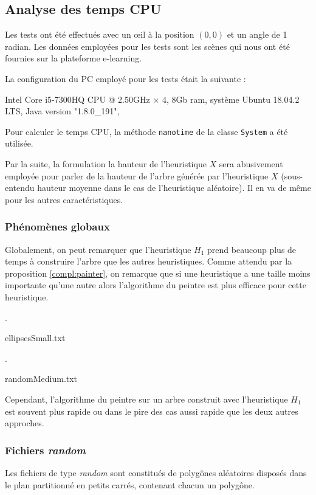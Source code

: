 \subsection{Analyse des temps CPU}
Les tests ont été effectués avec un \oe{}il à la position $(0,0)$ et un
angle de 1 radian. Les données employées pour les tests sont les scènes
qui nous ont été fournies sur la plateforme e-learning.

La configuration du PC employé pour les tests était la suivante :

\begin{center}
  Intel Core i5-7300HQ CPU @ 2.50GHz $\times$ 4,  8Gb ram, système Ubuntu 18.04.2 LTS,
  Java version "1.8.0\_191",
\end{center}
Pour calculer le temps CPU, la méthode \texttt{nanotime} de la classe
\texttt{System} a été utilisée.

Par la suite, la formulation la hauteur de l'heuristique $X$ sera abusivement
employée pour parler de la hauteur de l'arbre générée par l'heuristique $X$
(sous-entendu hauteur moyenne dans le cas de l'heuristique aléatoire).
Il en va de même pour les autres caractéristiques.

\subsubsection*{Phénomènes globaux}
Globalement, on peut remarquer que l'heuristique $H_1$ prend beaucoup plus de
temps à construire l'arbre que les autres heuristiques.
Comme attendu par la proposition \ref{compl:painter}, on remarque
que si une heuristique a une taille moins importante qu'une autre
alors l'algorithme du peintre est plus efficace pour cette heuristique.

\begin{table}[h].
\caption{ellipsesSmall.txt}

\end{table}

\begin{table}[h]. 
\caption{randomMedium.txt}

\end{table}

Cependant, l'algorithme du peintre sur un arbre construit
avec l'heuristique $H_1$ est souvent plus rapide ou dans le
pire des cas aussi rapide que les deux autres approches.

\subsubsection*{Fichiers \og\emph{random}\fg}
Les fichiers de type \og\emph{random}\fg{} sont constitués de polygônes
aléatoires disposés dans le plan partitionné en petits carrés, contenant
chacun un polygône.

